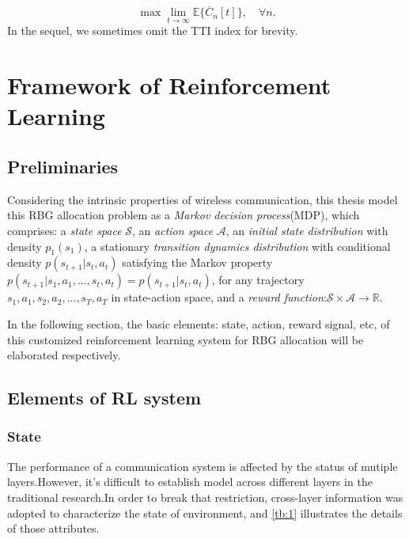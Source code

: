 \documentclass[conference,compsocconf]{IEEEtran}
\begin{document}
$$\max\lim_{t\rightarrow\infty}\mathbb{E}\{\bar{C}_n[t]\}, \quad\forall n.$$
In the sequel, we sometimes omit the TTI index for brevity.
%
%
%

\section{Framework of Reinforcement Learning}
\subsection{Preliminaries}
Considering the intrinsic properties of wireless communication, this thesis model this RBG allocation problem as a \textit{Markov decision process}(MDP), which comprises: a \textit{state space} $ \mathcal{S} $, an \textit{action space} $ \mathcal{A} $, an \textit{initial state distribution} with density $p_{1}(s_{1})$, a stationary \textit{transition dynamics distribution} with conditional density $ p(s_{t+1}|s_{t}, a_{t}) $ satisfying the Markov property $ p(s_{t+1}|s_{1}, a_{1}, ... ,s_{t}, a_{t}) = p(s_{t+1}|s_{t}, a_{t}) $, for any trajectory $s_{1}, a_{1}, s_{2}, a_{2},... , s_{T}, a_{T}$ in state-action space, and a \textit{reward function}:$ \mathcal{S} \times \mathcal{A} \rightarrow \mathbb{R} $.

In the following section, the basic elements: state, action, reward signal, etc, of this customized reinforcement learning system for RBG allocation will be elaborated respectively.

\subsection{Elements of RL system}

\subsubsection{State}
The performance of a communication system is affected by the status of mutiple layers.However, it's difficult to establish model across different layers in the traditional research.In order to break that restriction, cross-layer information was adopted to characterize the state of environment, and \ref{tb:1} illustrates the details of those attributes.
\end{document}
